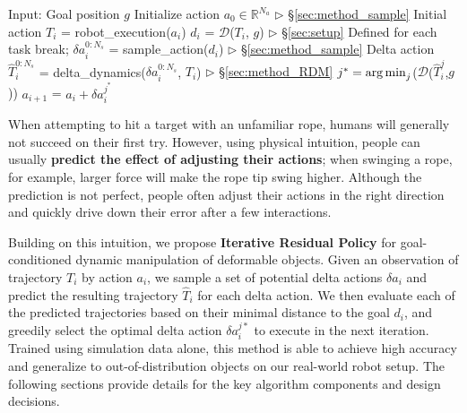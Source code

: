 \begin{algorithm}[t]
\caption{Iterative Residual Policy} \label{alg:IRP}
\begin{algorithmic}[1] 
\STATE Input: Goal position $g$
\STATE Initialize action $a_0 \in \mathbb{R}^{N_a}$ \hspace{0.1in} $\triangleright$ \S\ref{sec:method_sample} Initial action
    \STATE $T_i$ = robot\_execution($a_i$) 
    \STATE $d_i$ = $\mathcal{D}$($T_i$, $g$) \hspace{0.5in} $\triangleright$ \S\ref{sec:setup} Defined for each task
        \STATE break;
    \ENDIF
    \STATE ${\delta a_i^{0:N_s}}$ = sample\_action($d_i$)  \hspace{0.2in} $\triangleright$ \S\ref{sec:method_sample} Delta action
    \STATE ${\hat{T}_i^{0:N_s}}$ = delta\_dynamics($\delta a_i^{0:N_s}$, $T_i$)   {\hspace{0.2in} $\triangleright$ \S\ref{sec:method_RDM}}
    \STATE $j^* = \operatorname*{arg\,min}_{j}$($\mathcal{D}$($\hat{T}_i^{j}$,$g$))
    \STATE $a_{i+1}$ = $a_{i} + \delta a_i^{j^*}$
\ENDWHILE
\end{algorithmic}
\end{algorithm}

When attempting to hit a target with an unfamiliar rope, humans will generally not succeed on their first try. However, using physical intuition, people can usually \textbf{predict the effect of adjusting their actions}; when swinging a rope, for example, larger force will make the rope tip swing higher. Although the prediction is not perfect, people often adjust their actions in the right direction and quickly drive down their error after a few interactions.

Building on this intuition, we propose \textbf{Iterative Residual Policy} for goal-conditioned dynamic manipulation of deformable objects. Given an observation of trajectory $T_i$ by action $a_i$, we sample a set of potential delta actions $\delta a_i$ and predict the resulting trajectory $\hat{T}_i$ for each delta action. We then evaluate each of the predicted trajectories based on their minimal distance to the goal $d_i$, and greedily select the optimal delta action $\delta a_i^{j*}$ to execute in the next iteration. Trained using simulation data alone, this method is able to achieve high accuracy and generalize to out-of-distribution objects on our real-world robot setup. The following sections provide details for the key algorithm components and design decisions. 

